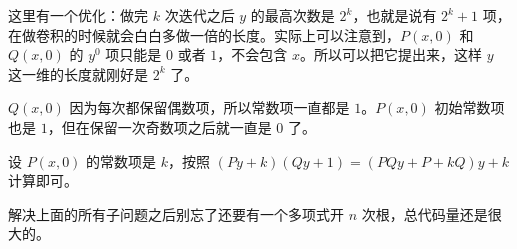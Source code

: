 这里有一个优化：做完 $k$ 次迭代之后 $y$ 的最高次数是 $2^k$，也就是说有 $2^k + 1$ 项，在做卷积的时候就会白白多做一倍的长度。实际上可以注意到，$P(x, 0)$ 和 $Q(x, 0)$ 的 $y^0$ 项只能是 $0$ 或者 $1$，不会包含 $x$。所以可以把它提出来，这样 $y$ 这一维的长度就刚好是 $2^k$ 了。

$Q(x, 0)$ 因为每次都保留偶数项，所以常数项一直都是 $1$。$P(x, 0)$ 初始常数项也是 $1$，但在保留一次奇数项之后就一直是 $0$ 了。

设 $P(x, 0)$ 的常数项是 $k$，按照 $(Py + k) (Qy + 1) = (PQy + P + kQ)y + k$ 计算即可。

解决上面的所有子问题之后别忘了还要有一个多项式开 $n$ 次根，总代码量还是很大的。

\inputminted{cpp}{../src/math/多项式复合逆.cpp}
